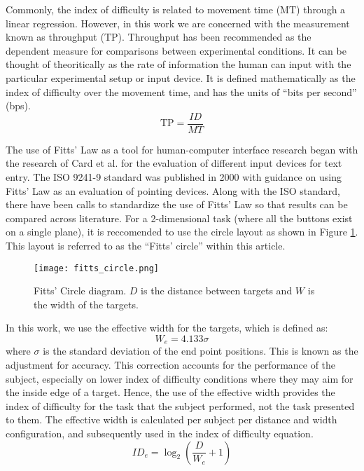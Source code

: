 Commonly, the index of difficulty is related to movement time ($\mathrm{MT}$) through a linear regression.
However, in this work we are concerned with the measurement known as throughput ($\mathrm{TP}$).
Throughput has been recommended as the dependent measure for comparisons between experimental conditions\cite{soukoreff_towards_2004}.
It can be thought of theoritically as the rate of information the human can input with the particular experimental setup or input device.
It is defined mathematically as the index of difficulty over the movement time, and has the units of ``bits per second'' (bps).
\begin{equation}
    \mathrm{TP}=\frac{ID}{MT}
    \label{eq:throughput}
\end{equation}

The use of Fitts' Law as a tool for human-computer interface research began with the research of Card et al.\cite{card_evaluation_1978} for the evaluation of different input devices for text entry.
The ISO 9241-9 standard was published in 2000 with guidance on using Fitts' Law as an evaluation of pointing devices\cite{international_organization_for_standardization_iso_2000}.
Along with the ISO standard, there have been calls to standardize the use of Fitts' Law so that results can be compared across literature\cite{soukoreff_towards_2004}.
For a 2-dimensional task (where all the buttons exist on a single plane), it is reccomended to use the circle layout as shown in Figure \ref{fig:ph_fitts_circle}.
This layout is referred to as the ``Fitts' circle'' within this article.

\begin{figure}
    \centering
    \texttt{[image: fitts\_circle.png]}
    \caption{Fitts' Circle diagram. $D$ is the distance between targets and $W$ is the width of the targets.}
    \label{fig:ph_fitts_circle}
\end{figure}

In this work, we use the effective width for the targets, which is defined as:
\begin{equation}
    W_e = 4.133\sigma
\end{equation}
where $\sigma$ is the standard deviation of the end point positions.
This is known as the adjustment for accuracy\cite{welford_fundamentals_1968}.
This correction accounts for the performance of the subject, especially on lower index of difficulty conditions where they may aim for the inside edge of a target.
Hence, the use of the effective width provides the index of difficulty for the task that the subject performed, not the task presented to them.
The effective width is calculated per subject per distance and width configuration, and subsequently used in the index of difficulty equation.
\begin{equation}
    {ID}_e=\log_2\left(\frac{D}{W_e}+1\right)
\end{equation}

